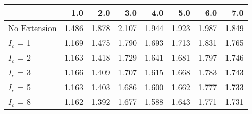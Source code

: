\begin{tabular}{lrrrrrrr}
\toprule
{} &   1.0 &   2.0 &   3.0 &   4.0 &   5.0 &   6.0 &   7.0 \\
\midrule
No Extension & 1.486 & 1.878 & 2.107 & 1.944 & 1.923 & 1.987 & 1.849 \\
$I_c$ = 1    & 1.169 & 1.475 & 1.790 & 1.693 & 1.713 & 1.831 & 1.765 \\
$I_c$ = 2    & 1.163 & 1.418 & 1.729 & 1.641 & 1.681 & 1.797 & 1.746 \\
$I_c$ = 3    & 1.166 & 1.409 & 1.707 & 1.615 & 1.668 & 1.783 & 1.743 \\
$I_c$ = 5    & 1.163 & 1.403 & 1.686 & 1.600 & 1.662 & 1.777 & 1.733 \\
$I_c$ = 8    & 1.162 & 1.392 & 1.677 & 1.588 & 1.643 & 1.771 & 1.731 \\
\bottomrule
\end{tabular}
